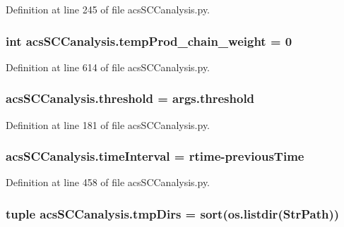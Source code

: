 Definition at line 245 of file acs\+S\+C\+Canalysis.\+py.

\hypertarget{a00130_aaf17c99825e0961e4cfaa173ddfffe84}{
\subsubsection[{temp\+Prod\+\_\+chain\+\_\+weight}]{\setlength{\rightskip}{0pt plus 5cm}int acs\+S\+C\+Canalysis.\+temp\+Prod\+\_\+chain\+\_\+weight = 0}}\label{a00130_aaf17c99825e0961e4cfaa173ddfffe84}


Definition at line 614 of file acs\+S\+C\+Canalysis.\+py.

\hypertarget{a00130_ae1fe4f15ea3fbcf05be2c82cd6f80307}{
\subsubsection[{threshold}]{\setlength{\rightskip}{0pt plus 5cm}acs\+S\+C\+Canalysis.\+threshold = args.\+threshold}}\label{a00130_ae1fe4f15ea3fbcf05be2c82cd6f80307}


Definition at line 181 of file acs\+S\+C\+Canalysis.\+py.

\hypertarget{a00130_a7d0f86310c439e970e0b41121364027c}{
\subsubsection[{time\+Interval}]{\setlength{\rightskip}{0pt plus 5cm}acs\+S\+C\+Canalysis.\+time\+Interval = {\bf rtime}-\/{\bf previous\+Time}}}\label{a00130_a7d0f86310c439e970e0b41121364027c}


Definition at line 458 of file acs\+S\+C\+Canalysis.\+py.

\hypertarget{a00130_ace4c571efd2e5ecd266ce5701f761a83}{
\subsubsection[{tmp\+Dirs}]{\setlength{\rightskip}{0pt plus 5cm}tuple acs\+S\+C\+Canalysis.\+tmp\+Dirs = sort(os.\+listdir({\bf Str\+Path}))}}\label{a00130_ace4c571efd2e5ecd266ce5701f761a83}


